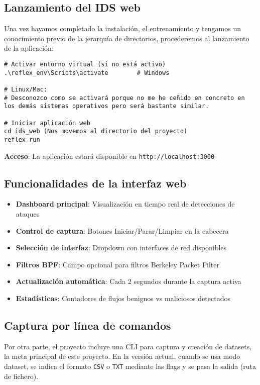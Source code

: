 \subsection*{Lanzamiento del IDS web}
Una vez hayamos completado la instalación, el entrenamiento y tengamos un conocimiento previo de la jerarquía de directorios, procederemos al lanzamiento de la aplicación:

\begin{lstlisting}[style=tfgbash,caption={Iniciar aplicación web},label=List.WebLaunch]
# Activar entorno virtual (si no está activo)
.\reflex_env\Scripts\activate        # Windows

# Linux/Mac:
# Desconozco como se activará porque no me he ceñido en concreto en los demás sistemas operativos pero será bastante similar.

# Iniciar aplicación web
cd ids_web (Nos movemos al directorio del proyecto)
reflex run
\end{lstlisting}

\textbf{Acceso}: La aplicación estará disponible en \texttt{http://localhost:3000}

\subsection*{Funcionalidades de la interfaz web}
\begin{itemize}
  \item \textbf{Dashboard principal}: Visualización en tiempo real de detecciones de ataques
  \item \textbf{Control de captura}: Botones Iniciar/Parar/Limpiar en la cabecera
  \item \textbf{Selección de interfaz}: Dropdown con interfaces de red disponibles
  \item \textbf{Filtros BPF}: Campo opcional para filtros Berkeley Packet Filter
  \item \textbf{Actualización automática}: Cada 2 segundos durante la captura activa
  \item \textbf{Estadísticas}: Contadores de flujos benignos vs maliciosos detectados
\end{itemize}

\subsection*{Captura por línea de comandos}
Por otra parte, el proyecto incluye una CLI para captura y creación de datasets, la meta principal de este proyecto. En la versión actual, cuando se usa modo dataset, se indica el formato \texttt{CSV} o \texttt{TXT} mediante las flags y se pasa la salida (ruta de fichero).
